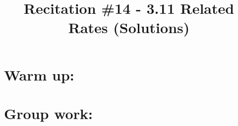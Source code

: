 \documentclass[nooutcomes]{ximera}
\title{Recitation \#14 - 3.11 Related Rates (Solutions)}
\begin{document}
\begin{abstract}		\end{abstract}
\maketitle

\section*{Warm up:} 

		\begin{freeResponse}
		
		\end{freeResponse}	
		
		
		

	
	
	
	
	

\section*{Group work:}



\begin{problem}

		\begin{freeResponse}
		
		\end{freeResponse}
		
		
\end{problem}
















\begin{problem}

		\begin{freeResponse}
		
		\end{freeResponse}
		
		
		

\end{problem}
	
	
	
	
	
	
	
	
			
			

\begin{problem}

		\begin{freeResponse}
			
		\end{freeResponse}
			
			
		
\end{problem}
\end{document}
